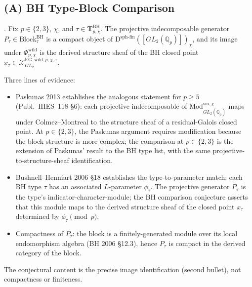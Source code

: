 \subsection{(A) BH Type-Block Comparison}

\begin{conjecture}
\label{v4-arith:f1a3-BH:conj:BH-packaging}
\ClaimStatusConjectured. Fix \(p\in\{2,3\}\), \(\chi\), and
\(\tau\in\mathbf{T}^{\mathrm{BH}}_{p,\chi}\). The projective indecomposable
generator \(P_{\tau}\in\mathrm{Block}^{\mathrm{BH}}_{\tau}\) is a compact
object of \(\mathrm{D}^{\mathrm{sph\text{-}fin}}([GL_{2}(\mathbb{Q}_{p})])_{\chi}\),
and its image under \(\Phi^{\mathrm{wild}}_{p,\chi}\) is the derived
structure sheaf of the BH closed point
\(x_{\tau}\in\mathcal{X}^{\mathrm{EG,wild},p,\chi,\tau}_{GL_{2}}\).
\end{conjecture}

\begin{remark}
\label{v4-arith:f1a3-BH:rem:BH-packaging-evidence}
Three lines of evidence:
\begin{itemize}
\item Paskunas 2013 establishes the analogous statement for \(p\geq 5\)
(Publ.~IHES~118 \S 6): each projective indecomposable of
\(\mathrm{Mod}^{\mathrm{sm},\chi}_{GL_{2}(\mathbb{Q}_{p})}\) maps under
Colmez--Montreal to the structure sheaf of a residual-Galois closed
point. At \(p\in\{2,3\}\), the Paskunas argument requires modification
because the block structure is more complex; the comparison at
\(p\in\{2,3\}\) is the extension of Paskunas' result to the BH type
list, with the same projective-to-structure-sheaf identification.
\item Bushnell--Henniart 2006 \S 18 establishes the type-to-parameter
match: each BH type \(\tau\) has an associated \(L\)-parameter
\(\phi_{\tau}\). The projective generator \(P_{\tau}\) is the type's
indicator-character-module; the BH comparison conjecture asserts that this
module maps to the derived structure sheaf of the closed point
\(x_{\tau}\) determined by \(\phi_{\tau}\pmod{p}\).
\item Compactness of \(P_{\tau}\): the block is a finitely-generated
module over its local endomorphism algebra (BH 2006 \S 12.3), hence
\(P_{\tau}\) is compact in the derived category of the block.
\end{itemize}
The conjectural content is the precise image identification (second
bullet), not compactness or finiteness.
\end{remark}

